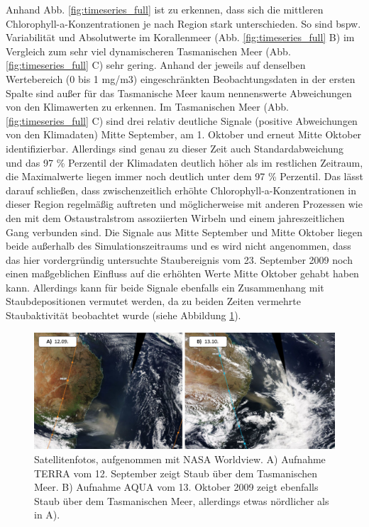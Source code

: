 \documentclass[12pt,a4paper,onecolumn]{scrartcl}
\begin{document}
Anhand Abb. \ref{fig:timeseries_full} ist zu erkennen, dass sich die mittleren Chlorophyll-a-Konzentrationen je nach Region stark unterschieden. So sind bspw. Variabilität und Absolutwerte im Korallenmeer (Abb. \ref{fig:timeseries_full} B) im Vergleich zum sehr viel dynamischeren Tasmanischen Meer (Abb. \ref{fig:timeseries_full} C) sehr gering. Anhand der jeweils auf denselben Wertebereich (0 bis 1 mg/m3) eingeschränkten Beobachtungsdaten in der ersten Spalte sind außer für das Tasmanische Meer kaum nennenswerte Abweichungen von den Klimawerten zu erkennen. Im Tasmanischen Meer (Abb. \ref{fig:timeseries_full} C) sind drei relativ deutliche Signale (positive Abweichungen von den Klimadaten) Mitte September, am 1. Oktober und erneut Mitte Oktober identifizierbar. Allerdings sind genau zu dieser Zeit auch Standardabweichung und das 97 \% Perzentil der Klimadaten deutlich höher als im restlichen Zeitraum, die Maximalwerte liegen immer noch deutlich unter dem 97 \% Perzentil. Das lässt darauf schließen, dass zwischenzeitlich erhöhte Chlorophyll-a-Konzentrationen in dieser Region regelmäßig auftreten und möglicherweise mit anderen Prozessen wie den mit dem Ostaustralstrom assoziierten Wirbeln und einem jahreszeitlichen Gang \citep{Tilburg.2002} verbunden sind. Die Signale aus Mitte September und Mitte Oktober liegen beide außerhalb des Simulationszeitraums und es wird nicht angenommen, dass das hier vordergründig untersuchte Staubereignis vom 23. September 2009 noch einen maßgeblichen Einfluss auf die erhöhten Werte Mitte Oktober gehabt haben kann. Allerdings kann für beide Signale ebenfalls ein Zusammenhang mit Staubdepositionen vermutet werden, da zu beiden Zeiten vermehrte Staubaktivität beobachtet wurde (siehe Abbildung \ref{fig:duststorms_surrounding}). 
\begin{figure}
\includegraphics[width=\textwidth]{bilder/duststorms_surround.png}
\caption{Satellitenfotos, aufgenommen mit NASA Worldview. A) Aufnahme TERRA vom 12. September zeigt Staub über dem Tasmanischen Meer. B) Aufnahme AQUA vom 13. Oktober 2009 zeigt ebenfalls Staub über dem Tasmanischen Meer, allerdings etwas nördlicher als in A). } \label{fig:duststorms_surrounding}
\end{figure}
\end{document}
